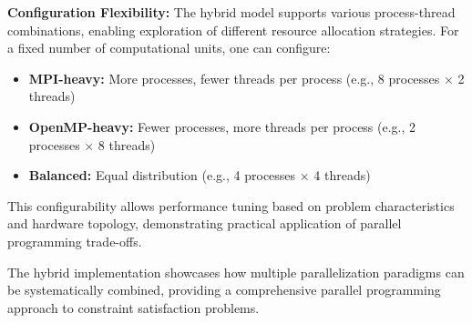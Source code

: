 \textbf{Configuration Flexibility:}
The hybrid model supports various process-thread combinations, enabling exploration of different resource allocation strategies. For a fixed number of computational units, one can configure:
\begin{itemize}
    \item \textbf{MPI-heavy:} More processes, fewer threads per process (e.g., 8 processes × 2 threads)
    \item \textbf{OpenMP-heavy:} Fewer processes, more threads per process (e.g., 2 processes × 8 threads)  
    \item \textbf{Balanced:} Equal distribution (e.g., 4 processes × 4 threads)
\end{itemize}

This configurability allows performance tuning based on problem characteristics and hardware topology, demonstrating practical application of parallel programming trade-offs.

The hybrid implementation showcases how multiple parallelization paradigms can be systematically combined, providing a comprehensive parallel programming approach to constraint satisfaction problems.
